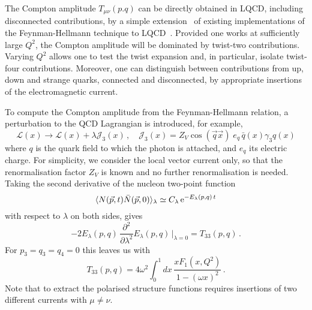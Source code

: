 The Compton amplitude $T_{\mu\nu}(p.q)$ can be directly obtained in LQCD, including disconnected contributions,  by a simple extension~\cite{Chambers:2017dov} of existing implementations of the Feynman-Hellmann technique to LQCD~\cite{Horsley:2012pz,Chambers:2014qaa,Chambers:2015bka}. Provided one works at sufficiently large $Q^2$, the Compton amplitude will be dominated by twist-two contributions. Varying $Q^2$ allows one to test the twist expansion and, in particular, isolate twist-four contributions. Moreover, one can distinguish between contributions from up, down and strange quarks, connected and disconnected, by appropriate insertions of the electromagnetic current. %

To compute the Compton amplitude from the Feynman-Hellmann relation, a perturbation to the QCD Lagrangian is introduced, for example,
\begin{equation}
\mathcal{L}(x) \rightarrow \mathcal{L}(x) + \lambda \mathcal{J}_3(x)\,, \quad \mathcal{J}_3(x)=Z_V\cos(\vec{q}\vec{x})\; e_q \,\bar{q}(x)\gamma_3 q(x) 
\label{in}
\end{equation}
where $q$ is the quark field to which the photon is attached, and $e_q$ its electric charge. For simplicity, we consider the local vector current only, so that the renormalisation factor $Z_V$ is known and no further renormalisation is needed. Taking the second derivative of the nucleon two-point function 
\begin{equation}
\langle N(\vec{p},t) \bar{N}(\vec{p},0)\rangle_\lambda \simeq C_\lambda\, {\rm e}^{-E_\lambda(p,q)\,t}
\end{equation}
with respect to $\lambda$ on both sides, gives
\begin{equation}
-2 E_\lambda(p,q)\, \frac{\partial^2}{\partial\lambda^2}  E_\lambda(p,q)\,\big|_{\lambda=0} = T_{33}(p,q) \,.
\end{equation}
For $p_3=q_3=q_4=0$ this leaves us with
\begin{equation}
T_{33}(p,q) = 4 \omega^2 \int_0^1 dx\,  \frac{xF_1(x,Q^2)}{1-(\omega x)^2} \,.
\label{ff}
\end{equation}
Note that to extract the polarised structure functions requires insertions of two different currents with $\mu\neq \nu$.  

